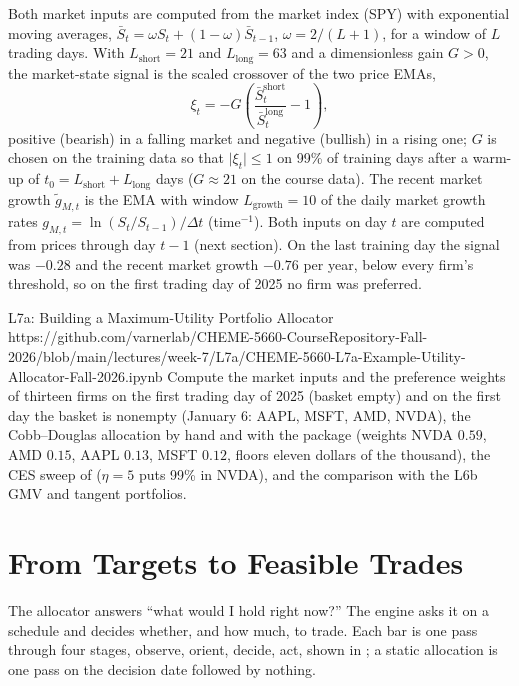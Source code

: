 \documentclass[11pt]{article}
\begin{document}
Both market inputs are computed from the market index (SPY) with exponential moving averages, $\bar S_t=\omega S_t+(1-\omega)\bar S_{t-1}$, $\omega=2/(L+1)$, for a window of $L$ trading days. With $L_{\mathrm{short}}=21$ and $L_{\mathrm{long}}=63$ and a dimensionless gain $G>0$, the market-state signal is the scaled crossover of the two price EMAs,
\begin{equation}
  \label{eq:signal}
  \xi_t=-G\left(\frac{\bar S^{\mathrm{short}}_t}{\bar S^{\mathrm{long}}_t}-1\right),
\end{equation}
positive (bearish) in a falling market and negative (bullish) in a rising one; $G$ is chosen on the training data so that $\lvert\xi_t\rvert\le1$ on 99\% of training days after a warm-up of $t_0=L_{\mathrm{short}}+L_{\mathrm{long}}$ days ($G\approx21$ on the course data). The recent market growth $\tilde g_{M,t}$ is the EMA with window $L_{\mathrm{growth}}=10$ of the daily market growth rates $g_{M,t}=\ln(S_t/S_{t-1})/\Delta t$ (time$^{-1}$). Both inputs on day $t$ are computed from prices through day $t-1$ (next section). On the last training day the signal was $-0.28$ and the recent market growth $-0.76$ per year, below every firm's threshold, so on the first trading day of 2025 no firm was preferred.

\notebooklink
  {L7a: Building a Maximum-Utility Portfolio Allocator}
  {https://github.com/varnerlab/CHEME-5660-CourseRepository-Fall-2026/blob/main/lectures/week-7/L7a/CHEME-5660-L7a-Example-Utility-Allocator-Fall-2026.ipynb}
  {Compute the market inputs and the preference weights  of thirteen firms on the first trading day of 2025 (basket empty) and on the first day the basket is nonempty (January 6: AAPL, MSFT, AMD, NVDA), the Cobb--Douglas allocation  by hand and with the package (weights NVDA $0.59$, AMD $0.15$, AAPL $0.13$, MSFT $0.12$, floors eleven dollars of the thousand), the CES sweep of  ($\eta=5$ puts 99\% in NVDA), and the comparison with the L6b GMV and tangent portfolios.}

\section{From Targets to Feasible Trades}

The allocator answers ``what would I hold right now?'' The engine asks it on a schedule and decides whether, and how much, to trade. Each bar is one pass through four stages, observe, orient, decide, act, shown in ; a static allocation is one pass on the decision date followed by nothing.
\end{document}
